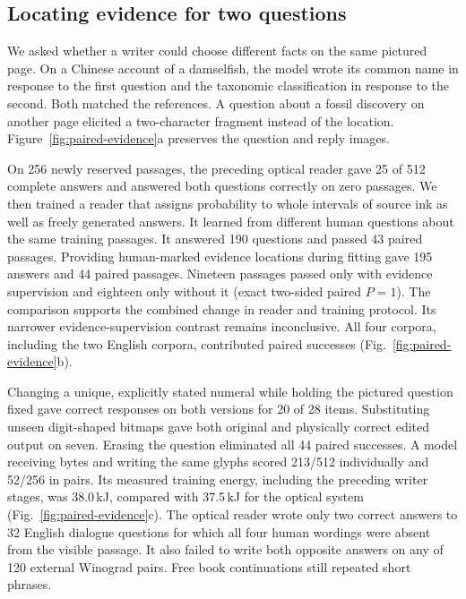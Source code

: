 \subsection*{Locating evidence for two questions}
We asked whether a writer could choose different facts on the same pictured page. On a Chinese account of a damselfish, the model wrote its common name in response to the first question and the taxonomic classification in response to the second. Both matched the references. A question about a fossil discovery on another page elicited a two-character fragment instead of the location. Figure~\ref{fig:paired-evidence}a preserves the question and reply images.

On 256 newly reserved passages, the preceding optical reader gave 25 of 512 complete answers and answered both questions correctly on zero passages. We then trained a reader that assigns probability to whole intervals of source ink as well as freely generated answers. It learned from different human questions about the same training passages. It answered 190 questions and passed 43 paired passages. Providing human-marked evidence locations during fitting gave 195 answers and 44 paired passages. Nineteen passages passed only with evidence supervision and eighteen only without it (exact two-sided paired $P=1$). The comparison supports the combined change in reader and training protocol. Its narrower evidence-supervision contrast remains inconclusive. All four corpora, including the two English corpora, contributed paired successes (Fig.~\ref{fig:paired-evidence}b).

Changing a unique, explicitly stated numeral while holding the pictured question fixed gave correct responses on both versions for 20 of 28 items. Substituting unseen digit-shaped bitmaps gave both original and physically correct edited output on seven. Erasing the question eliminated all 44 paired successes. A model receiving bytes and writing the same glyphs scored 213/512 individually and 52/256 in pairs. Its measured training energy, including the preceding writer stages, was 38.0\,kJ, compared with 37.5\,kJ for the optical system (Fig.~\ref{fig:paired-evidence}c). The optical reader wrote only two correct answers to 32 English dialogue questions for which all four human wordings were absent from the visible passage. It also failed to write both opposite answers on any of 120 external Winograd pairs. Free book continuations still repeated short phrases.
